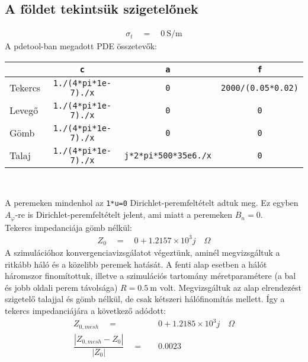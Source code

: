 \subsection{A földet tekintsük szigetelőnek}
%
\begin{align}
    \sigma_t\quad=\quad\qty{0}{\siemens\per\metre}
\end{align}
A pdetool-ban megadott PDE összetevők:\\
\vspace{0.2cm}
\begin{center}
\begin{tabular}{|l||c|c|c|}
    \hline
                    & \verb|c|                 & \verb|a|                   & \verb|f| \\
    \hline
    \hline
    Tekercs      & \verb|1./(4*pi*1e-7)./x| & \verb|0|                   & \verb|2000/(0.05*0.02)| \\
    \hline
    Levegő       & \verb|1./(4*pi*1e-7)./x| & \verb|0|                   & \verb|0| \\
    \hline
    Gömb         & \verb|1./(4*pi*1e-7)./x| & \verb|0|                   & \verb|0| \\
    \hline
    Talaj        & \verb|1./(4*pi*1e-7)./x| & \verb|j*2*pi*500*35e6./x|  & \verb|0| \\
    \hline
\end{tabular}\\
\end{center}
\vspace{0.5cm}
A peremeken mindenhol az \verb|1*u=0| Dirichlet-peremfeltételt adtuk meg. Ez egyben $A_{\varphi}$-re is Dirichlet-peremfeltételt jelent, ami miatt a peremeken $B_n=0$.\\[3ex]
%
Tekercs impedanciája gömb nélkül:
\begin{align}
    Z_0\quad=\quad0 + 1.2157\times10^3j\quad\Omega
\end{align}
%
A szimulációhoz konvergenciavizsgálatot végeztünk, aminél megvizsgáltuk a ritkább háló és a közelibb peremek hatását. A fenti alap esetben a hálót háromszor finomítottuk, illetve a szimulációs tartomány méretparamétere (a bal és jobb oldali perem távolsága) $R=\qty{0.5}{\metre}$ volt. Megvizsgáltuk az alap elrendezést szigetelő talajjal és gömb nélkül, de csak kétszeri hálófinomítás mellett. Így a tekercs impedanciájára a következő adódott:
\begin{align}
    Z_{0,mesh}\quad=&\quad0 + 1.2185\times10^3j\quad\Omega\\
    \dfrac{|Z_{0,mesh}-Z_0|}{|Z_0|}\quad=&\quad0.0023
\end{align}
